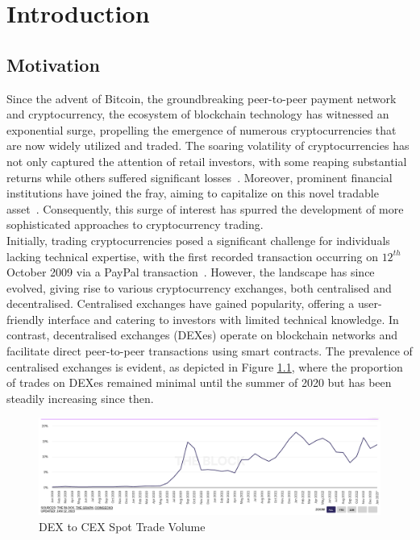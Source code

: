 \chapter{Introduction}
\section{Motivation}
Since the advent of Bitcoin, the groundbreaking peer-to-peer payment network and cryptocurrency, the ecosystem of blockchain technology has witnessed an exponential surge, propelling the emergence of numerous cryptocurrencies that are now widely utilized and traded. The soaring volatility of cryptocurrencies has not only captured the attention of retail investors, with some reaping substantial returns while others suffered significant losses~\cite{losing_money_on_crypto_2021}. Moreover, prominent financial institutions have joined the fray, aiming to capitalize on this novel tradable asset~\cite{gondek_what_nodate}. Consequently, this surge of interest has spurred the development of more sophisticated approaches to cryptocurrency trading.
\\[3mm]
Initially, trading cryptocurrencies posed a significant challenge for individuals lacking technical expertise, with the first recorded transaction occurring on $12^{th}$ October 2009 via a PayPal transaction~\cite{noauthor_history_nodate}. However, the landscape has since evolved, giving rise to various cryptocurrency exchanges, both centralised and decentralised. Centralised exchanges have gained popularity, offering a user-friendly interface and catering to investors with limited technical knowledge. In contrast, decentralised exchanges (DEXes) operate on blockchain networks and facilitate direct peer-to-peer transactions using smart contracts. The prevalence of centralised exchanges is evident, as depicted in Figure \ref{fig:dex_to_cex}, where the proportion of trades on DEXes remained minimal until the summer of 2020 but has been steadily increasing since then.

\begin{figure}[htb!]
    \centering
    \includegraphics[width=\textwidth]{introduction/Images/dex_to_cex.png}
    \caption{{DEX} to {CEX} {Spot} {Trade} {Volume}~\cite{dex_to_cex}}
    \label{fig:dex_to_cex}
\end{figure}
\vspace{-1cm}

